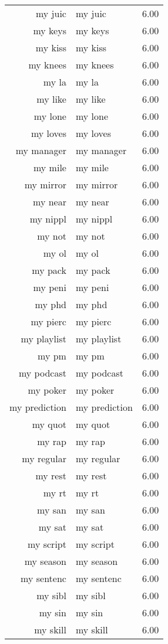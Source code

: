 \begin{table}[ht]
\begin{tabular}{rlr}
  my juic & my juic & 6.00 \\ 
  my keys & my keys & 6.00 \\ 
  my kiss & my kiss & 6.00 \\ 
  my knees & my knees & 6.00 \\ 
  my la & my la & 6.00 \\ 
  my like & my like & 6.00 \\ 
  my lone & my lone & 6.00 \\ 
  my loves & my loves & 6.00 \\ 
  my manager & my manager & 6.00 \\ 
  my mile & my mile & 6.00 \\ 
  my mirror & my mirror & 6.00 \\ 
  my near & my near & 6.00 \\ 
  my nippl & my nippl & 6.00 \\ 
  my not & my not & 6.00 \\ 
  my ol & my ol & 6.00 \\ 
  my pack & my pack & 6.00 \\ 
  my peni & my peni & 6.00 \\ 
  my phd & my phd & 6.00 \\ 
  my pierc & my pierc & 6.00 \\ 
  my playlist & my playlist & 6.00 \\ 
  my pm & my pm & 6.00 \\ 
  my podcast & my podcast & 6.00 \\ 
  my poker & my poker & 6.00 \\ 
  my prediction & my prediction & 6.00 \\ 
  my quot & my quot & 6.00 \\ 
  my rap & my rap & 6.00 \\ 
  my regular & my regular & 6.00 \\ 
  my rest & my rest & 6.00 \\ 
  my rt & my rt & 6.00 \\ 
  my san & my san & 6.00 \\ 
  my sat & my sat & 6.00 \\ 
  my script & my script & 6.00 \\ 
  my season & my season & 6.00 \\ 
  my sentenc & my sentenc & 6.00 \\ 
  my sibl & my sibl & 6.00 \\ 
  my sin & my sin & 6.00 \\ 
  my skill & my skill & 6.00 \\ 

\end{tabular}
\end{table}
